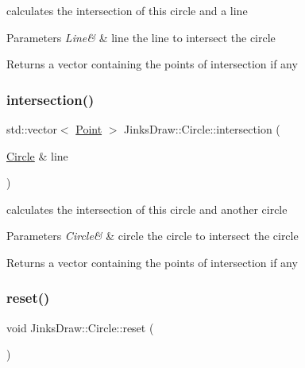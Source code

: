 calculates the intersection of this circle and a line 


\begin{DoxyParams}{Parameters}
{\em Line\&} & line the line to intersect the circle \\
\hline
\end{DoxyParams}
\begin{DoxyReturn}{Returns}
a vector containing the points of intersection if any 
\end{DoxyReturn}
\mbox{\label{class_jinks_draw_1_1_circle_a6b1158a9744529ce7198b66d1bcf8973}} 
\subsubsection{\texorpdfstring{intersection()}{intersection()}\hspace{0.1cm}{\footnotesize\ttfamily [2/2]}}
{\footnotesize\ttfamily std\+::vector$<$ \mbox{\hyperlink{class_jinks_draw_1_1_point}{Point}} $>$ Jinks\+Draw\+::\+Circle\+::intersection (\begin{DoxyParamCaption}\item[{\mbox{\hyperlink{class_jinks_draw_1_1_circle}{Circle}} \&}]{line }\end{DoxyParamCaption})}



calculates the intersection of this circle and another circle 


\begin{DoxyParams}{Parameters}
{\em Circle\&} & circle the circle to intersect the circle \\
\hline
\end{DoxyParams}
\begin{DoxyReturn}{Returns}
a vector containing the points of intersection if any 
\end{DoxyReturn}
\mbox{\label{class_jinks_draw_1_1_circle_aeac44e44f82737c37dfad7f8142e5754}} 
\subsubsection{\texorpdfstring{reset()}{reset()}}
{\footnotesize\ttfamily void Jinks\+Draw\+::\+Circle\+::reset (\begin{DoxyParamCaption}{ }\end{DoxyParamCaption})}

